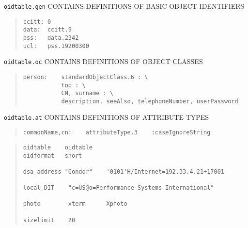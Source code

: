 \begin{bwslide}

\begin{nrtc}
\item	\verb"oidtable.gen" CONTAINS DEFINITIONS OF BASIC OBJECT IDENTIFIERS
\begin{quote}\small\begin{verbatim}
ccitt: 0
data:  ccitt.9
pss:   data.2342
ucl:   pss.19200300
\end{verbatim}\end{quote}

\item	\verb"oidtable.oc" CONTAINS DEFINITIONS OF OBJECT CLASSES
\begin{quote}\small\begin{verbatim}
person:    standardObjectClass.6 : \
           top : \
           CN, surname : \
           description, seeAlso, telephoneNumber, userPassword
\end{verbatim}\end{quote}

\item	\verb"oidtable.at" CONTAINS DEFINITIONS OF ATTRIBUTE TYPES
\begin{quote}\small\begin{verbatim}
commonName,cn:    attributeType.3    :caseIgnoreString
\end{verbatim}\end{quote}
\end{nrtc}
\end{bwslide}


\begin{bwslide}

\begin{quote}\small\begin{verbatim}
oidtable    oidtable
oidformat   short

dsa_address "Condor"    '0101'H/Internet=192.33.4.21+17001

local_DIT    "c=US@o=Performance Systems International"

photo        xterm      Xphoto

sizelimit    20
\end{verbatim}\end{quote}
\end{bwslide}


